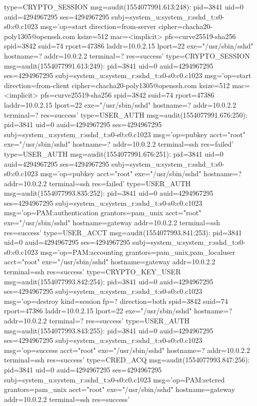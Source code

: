 \documentclass[]{report}
\newenvironment{Shaded}{}{}
\newcommand{\NormalTok}[1]{#1}
\begin{document}
\begin{Shaded}
\begin{Highlighting}[]
\NormalTok{type=CRYPTO_SESSION msg=audit(1554077991.613:248): pid=3841 uid=0 auid=4294967295 ses=4294967295 subj=system_u:system_r:sshd_t:s0-s0:c0.c1023 msg='op=start direction=from-server cipher=chacha20-poly1305@openssh.com ksize=512 mac=<implicit> pfs=curve25519-sha256 spid=3842 suid=74 rport=47386 laddr=10.0.2.15 lport=22  exe="/usr/sbin/sshd" hostname=? addr=10.0.2.2 terminal=? res=success'}
\NormalTok{type=CRYPTO_SESSION msg=audit(1554077991.613:249): pid=3841 uid=0 auid=4294967295 ses=4294967295 subj=system_u:system_r:sshd_t:s0-s0:c0.c1023 msg='op=start direction=from-client cipher=chacha20-poly1305@openssh.com ksize=512 mac=<implicit> pfs=curve25519-sha256 spid=3842 suid=74 rport=47386 laddr=10.0.2.15 lport=22  exe="/usr/sbin/sshd" hostname=? addr=10.0.2.2 terminal=? res=success'}
\NormalTok{type=USER_AUTH msg=audit(1554077991.676:250): pid=3841 uid=0 auid=4294967295 ses=4294967295 subj=system_u:system_r:sshd_t:s0-s0:c0.c1023 msg='op=pubkey acct="root" exe="/usr/sbin/sshd" hostname=? addr=10.0.2.2 terminal=ssh res=failed'}
\NormalTok{type=USER_AUTH msg=audit(1554077991.676:251): pid=3841 uid=0 auid=4294967295 ses=4294967295 subj=system_u:system_r:sshd_t:s0-s0:c0.c1023 msg='op=pubkey acct="root" exe="/usr/sbin/sshd" hostname=? addr=10.0.2.2 terminal=ssh res=failed'}
\NormalTok{type=USER_AUTH msg=audit(1554077993.835:252): pid=3841 uid=0 auid=4294967295 ses=4294967295 subj=system_u:system_r:sshd_t:s0-s0:c0.c1023 msg='op=PAM:authentication grantors=pam_unix acct="root" exe="/usr/sbin/sshd" hostname=gateway addr=10.0.2.2 terminal=ssh res=success'}
\NormalTok{type=USER_ACCT msg=audit(1554077993.841:253): pid=3841 uid=0 auid=4294967295 ses=4294967295 subj=system_u:system_r:sshd_t:s0-s0:c0.c1023 msg='op=PAM:accounting grantors=pam_unix,pam_localuser acct="root" exe="/usr/sbin/sshd" hostname=gateway addr=10.0.2.2 terminal=ssh res=success'}
\NormalTok{type=CRYPTO_KEY_USER msg=audit(1554077993.842:254): pid=3841 uid=0 auid=4294967295 ses=4294967295 subj=system_u:system_r:sshd_t:s0-s0:c0.c1023 msg='op=destroy kind=session fp=? direction=both spid=3842 suid=74 rport=47386 laddr=10.0.2.15 lport=22  exe="/usr/sbin/sshd" hostname=? addr=10.0.2.2 terminal=? res=success'}
\NormalTok{type=USER_AUTH msg=audit(1554077993.843:255): pid=3841 uid=0 auid=4294967295 ses=4294967295 subj=system_u:system_r:sshd_t:s0-s0:c0.c1023 msg='op=success acct="root" exe="/usr/sbin/sshd" hostname=? addr=10.0.2.2 terminal=ssh res=success'}
\NormalTok{type=CRED_ACQ msg=audit(1554077993.847:256): pid=3841 uid=0 auid=4294967295 ses=4294967295 subj=system_u:system_r:sshd_t:s0-s0:c0.c1023 msg='op=PAM:setcred grantors=pam_unix acct="root" exe="/usr/sbin/sshd" hostname=gateway addr=10.0.2.2 terminal=ssh res=success'}

\end{Highlighting}
\end{Shaded}
\end{document}
